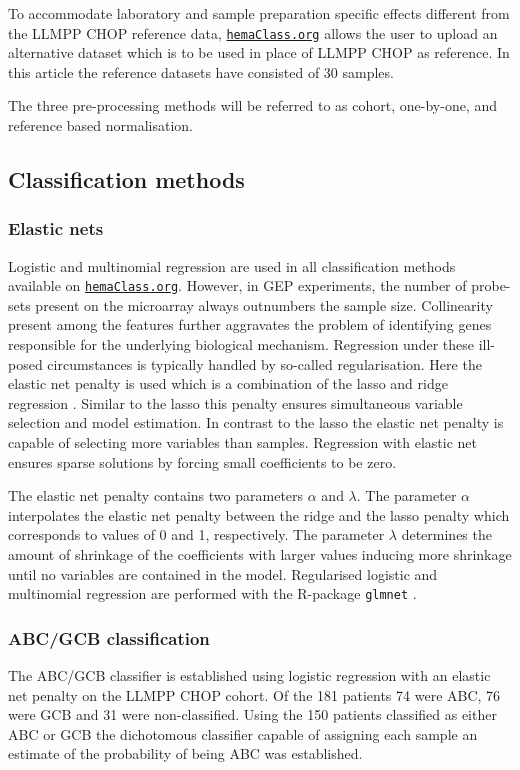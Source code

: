 \documentclass{article}
\newcommand{\hemaClass}{\href{http://hemaClass.org}{\texttt{hemaClass.org}}}
\begin{document}
To accommodate laboratory and sample preparation specific effects different from the LLMPP CHOP reference data, \hemaClass{} allows the user to upload an alternative dataset which is to be used in place of LLMPP CHOP as reference.
In this article the reference datasets have consisted of 30 samples.

The three pre-processing methods will be referred to as cohort, one-by-one, and reference based normalisation.

\subsection{Classification methods}

\subsubsection{Elastic nets}
Logistic and multinomial regression are used in all classification methods available on \hemaClass{}.
However, in GEP experiments, the number of probe-sets present on the microarray always outnumbers the sample size.
Collinearity present among the features further aggravates the problem of identifying genes responsible for the underlying biological mechanism.
Regression under these ill-posed circumstances is typically handled by so-called regularisation.
Here the elastic net penalty \citep{Friedman2010, Zou2005} is used which is a combination of the lasso \citep{Tibshirani1996} and ridge regression \citep{Hoerl1970}.
Similar to the lasso this penalty ensures simultaneous variable selection and model estimation.
In contrast to the lasso the elastic net penalty is capable of selecting more variables than samples.
Regression with elastic net ensures sparse solutions by forcing small coefficients to be zero.

The elastic net penalty contains two parameters $\alpha$ and $\lambda$.
The parameter $\alpha$ interpolates the elastic net penalty between the ridge and the lasso penalty which corresponds to values of 0 and 1, respectively.
The parameter $\lambda$ determines the amount of shrinkage of the coefficients with larger values inducing more shrinkage until no variables are contained in the model.
Regularised logistic and multinomial regression are performed with the R-package \texttt{glmnet} \citep{Friedman2010}.

\subsubsection{ABC/GCB classification}
The ABC/GCB classifier is established using logistic regression with an elastic net penalty on the LLMPP CHOP cohort.
Of the 181 patients 74 were ABC, 76 were GCB and 31 were non-classified.
Using the 150 patients classified as either ABC or GCB the dichotomous classifier capable of assigning each sample an estimate of the probability of being ABC was established.
\end{document}
